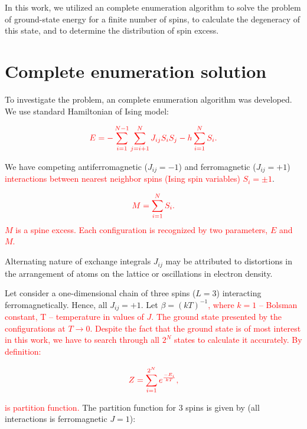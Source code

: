 \documentclass[preprint,12pt]{elsarticle}
\begin{document}
	In this work, we utilized an complete enumeration algorithm \cite{dias2023ground, padalko2021parallel} to solve the problem of ground-state energy for a finite number of spins, to calculate the degeneracy of this state, and to determine the distribution of spin excess.
	
	\section{Complete enumeration solution}
	
	To investigate the problem, an complete enumeration algorithm was developed. We use standard Hamiltonian of Ising model:
	
	\begin{equation}
		\color{red}
		E = -\sum^{N - 1}_{i=1}\sum^N_{j = i + 1} J_{ij} S_i S_j - h \sum^N_{i=1} S_i.
		\label{eq:ising_energy}
	\end{equation}
	
	We have competing antiferromagnetic ($J_{ij} = -1$) and ferromagnetic ($J_{ij} = +1$) \textcolor{red}{interactions between nearest neighbor spins (Ising spin variables) $S_i = \pm1$}. 
	
	\begin{equation}
		\color{red}
		M = \sum^N_{i=1} S_i.
		\label{eq:spin_excess} 
	\end{equation}
	\textcolor{red}{$M$ is a spine excess. Each configuration is recognized by two parameters, $E$ and $M$.}
	
	
	Alternating nature of exchange integrals $J_{ij}$ may be attributed to distortions in the arrangement of atoms on the lattice or oscillations in electron density.
	
	Let consider a one-dimensional chain of three spins ($L = 3$) interacting ferromagnetically. Hence, all $J_{ij} = +1$. Let $\beta = (kT)^{-1}$\textcolor{red}{, where $k = 1$ -- Bolsman constant, T -- temperature in values of $J$. The ground state presented by the configurations at $T \rightarrow 0$. Despite the fact that the ground state is of most interest in this work, we have to search through all $2^N$ states to calculate it accurately. By definition:}
	
	\begin{equation}
		\color{red}
		Z = \sum_{i = 1}^{2 ^ N} e^{\frac{-E_i}{kT}},
		\label{eq:stat_difinition}
	\end{equation}
	
	\noindent \textcolor{red}{is partition function.} The partition function for 3 spins is given by (all interactions is ferromagnetic $J = 1$):
	
\end{document}
